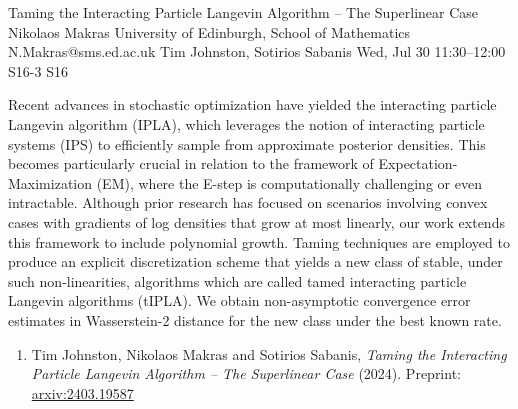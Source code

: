 \begin{talk}
  {Taming the Interacting Particle Langevin Algorithm -- The Superlinear Case}%
  {Nikolaos Makras}%
  {University of Edinburgh, School of Mathematics}%
  {N.Makras@sms.ed.ac.uk}%
  {Tim Johnston, Sotirios Sabanis}%
  {}%
  {Wed, Jul 30 11:30--12:00}%
  {S16-3}%
  {S16}%
  
    
   
Recent advances in stochastic optimization have yielded the interacting particle Langevin algorithm (IPLA), which leverages the notion of interacting particle systems (IPS) to efficiently sample from approximate posterior densities. This becomes particularly crucial in relation to the framework of Expectation-Maximization (EM), where the E-step is computationally challenging or even intractable. Although prior research has focused on scenarios involving convex cases with gradients of log densities that grow at most linearly, our work extends this framework to include polynomial growth. Taming techniques are employed to produce an explicit discretization scheme that yields a new class of stable, under such non-linearities, algorithms which are called tamed interacting particle Langevin algorithms (tIPLA). We obtain non-asymptotic convergence error estimates in Wasserstein-2 distance for the new class under the best known rate. 

\medskip

\begin{enumerate}
 \item[{[1]}] Tim Johnston, Nikolaos Makras and Sotirios Sabanis, {\it Taming the Interacting Particle Langevin Algorithm -- The Superlinear Case} (2024). Preprint: \href{https://arxiv.org/abs/2403.19587}{arxiv:2403.19587} 
\end{enumerate}

\end{talk}

